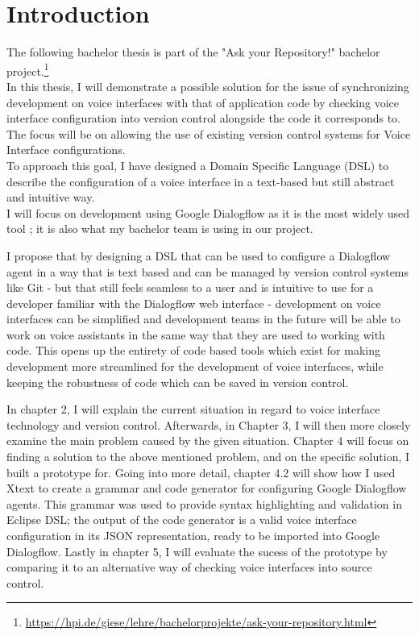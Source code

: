 
\chapter{Introduction}

The following bachelor thesis is part of the "Ask your Repository!" bachelor project.\footnote{\url{https://hpi.de/giese/lehre/bachelorprojekte/ask-your-repository.html}}\\
In this thesis, I will demonstrate a possible solution for the issue of synchronizing development on voice interfaces with that of application code by checking voice interface configuration into version control alongside the code it corresponds to. The focus will be on allowing the use of existing version control systems for Voice Interface configurations.\\
To approach this goal, I have designed a Domain Specific Language (DSL) to describe the configuration of a voice interface in a text-based but still abstract and intuitive way. \\
I will focus on development using Google Dialogflow as it is the most widely used tool \cite{stackups}; it is also what my bachelor team is using in our project.

I propose that by designing a DSL that can be used to configure a Dialogflow agent in a way that is text based and can be managed by version control systems like Git - but that still feels seamless to a user and is intuitive to use for a developer familiar with the Dialogflow web interface - development on voice interfaces can be simplified and development teams in the future will be able to work on voice assistants in the same way that they are used to working with code. This opens up the entirety of code based tools which exist for making development more streamlined for the development of voice interfaces, while keeping the robustness of code which can be saved in version control.

In chapter 2, I will explain the current situation in regard to voice interface technology and version control. Afterwards, in Chapter 3, I will then more closely examine the main problem caused by the given situation.
Chapter 4 will focus on finding a solution to the above mentioned problem, and on the specific solution, I built a prototype for. Going into more detail, chapter 4.2 will show how I used Xtext to create a grammar and code generator for configuring Google Dialogflow agents. This grammar was used to provide syntax highlighting and validation in Eclipse DSL; the output of the code generator is a valid voice interface configuration in its JSON representation, ready to be imported into Google Dialogflow.
Lastly in chapter 5, I will evaluate the sucess of the prototype by comparing it to an alternative way of checking voice interfaces into source control. 

